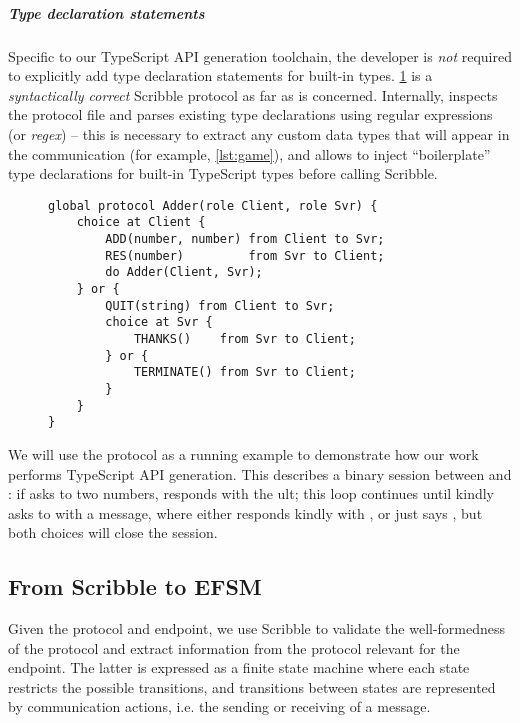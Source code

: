 \subparagraph{Type declaration statements}
Specific to our TypeScript API generation toolchain,
the developer is \textit{not} required to explicitly
add type declaration statements for built-in types.
\cref{lst:adder} is a \textit{syntactically correct}
Scribble protocol as far as 
 is concerned. 
Internally,  inspects the protocol file
and parses existing type declarations using regular expressions
(or \textit{regex}) -- this is necessary to extract any
custom data types that will appear in the communication (for example,
\cref{lst:game}), and allows  to inject
``boilerplate'' type declarations for built-in TypeScript types before
calling Scribble.

\begin{figure}[!ht]
\begin{lstlisting}[language=Scribble]
global protocol Adder(role Client, role Svr) {
	choice at Client {
		ADD(number, number) from Client to Svr;
		RES(number)         from Svr to Client;
		do Adder(Client, Svr);
	} or {
		QUIT(string) from Client to Svr;
		choice at Svr {
			THANKS()    from Svr to Client;
		} or {
			TERMINATE() from Svr to Client;
		}
	}
}
\end{lstlisting}
\label{lst:adder}
\end{figure}

We will use the  protocol as a running example
to demonstrate how our work performs TypeScript API generation.
This describes a binary session between  and :
if  asks  to  two numbers,
 responds with the ult; this loop continues
until  kindly asks to  with a message,
where  either responds kindly with ,
or just says , but both choices will close the session.

\subsection{From Scribble to EFSM}
\label{subsection:efsm}

Given the protocol and endpoint, we use Scribble
to validate the well-formedness of the protocol and extract
information from the protocol relevant for the endpoint.
The latter is expressed as a finite state machine
where each state restricts the possible transitions, 
and transitions between states are represented by
communication actions, i.e. the sending or receiving of a message.

